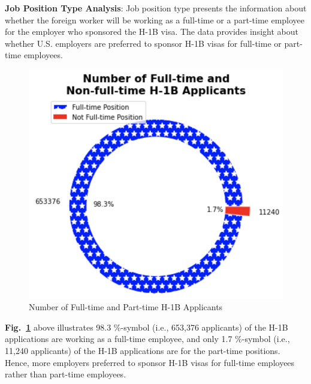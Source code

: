 \documentclass[conference]{IEEEtran}
\begin{document}
\textbf{Job Position Type Analysis}: Job position type presents the information about whether the foreign worker will be working as a full-time or a part-time employee for the employer who sponsored the H-1B visa. The data provides insight about whether U.S. employers are preferred to sponsor H-1B visas for full-time or part-time employees.

\begin{figure}[htbp]
\centerline{\includegraphics[scale = 0.5]{FT_NA.png}}
\caption{Number of Full-time and Part-time H-1B Applicants}
\label{fig_ft_nft_1}
\end{figure}

\textbf{Fig.~\ref{fig_ft_nft_1}} above illustrates 98.3 \%-symbol (i.e., 653,376 applicants) of the H-1B applications are working as a full-time employee, and only 1.7 \%-symbol (i.e., 11,240 applicants) of the H-1B applications are for the part-time positions. Hence, more employers preferred to sponsor H-1B visas for full-time employees rather than part-time employees.
\end{document}
